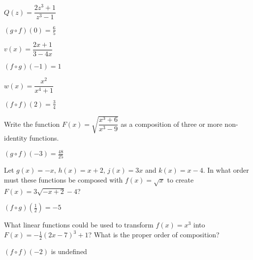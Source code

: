 \documentclass{ximera}
\begin{document}
\begin{question}
$Q(z) = \dfrac{2z^3+1}{z^3-1}$

\begin{solution}
$(g\circ f)(0) = \frac{6}{5}$
\end{solution}

\end{question}

\begin{question}
$v(x) = \dfrac{2x+1}{3-4x}$
\begin{solution}
$(f\circ g)(-1) = 1$
\end{solution}

\end{question}

\begin{question}
$w(x) = \dfrac{x^2}{x^4+1}$ 

\begin{solution}
$(f \circ f)(2) = \frac{3}{4}$








\end{solution}

\end{question}

\begin{question}
Write the function $F(x) = \sqrt{\dfrac{x^{3} + 6}{x^{3} - 9}}$ as a composition of three or more non-identity functions.
\begin{solution}
$(g\circ f)(-3) = \frac{48}{25}$
\end{solution}

\end{question}

\begin{question}
Let $g(x) = -x, \, h(x) = x + 2, \, j(x) = 3x$ and $k(x) = x - 4$.  In what order must these functions be composed with $f(x) = \sqrt{x}$ to create $F(x) = 3\sqrt{-x + 2} - 4$?
\begin{solution}
$(f\circ g)\left(\frac{1}{2}\right) = -5$
\end{solution}

\end{question}

\begin{question}
What linear functions could be used to transform $f(x) = x^{3}$ into $F(x) = -\frac{1}{2}(2x - 7)^{3} + 1$?  What is the proper order of composition?
\begin{solution}
$(f \circ f)(-2)$ is undefined


\end{solution}

\end{question}
\end{document}
